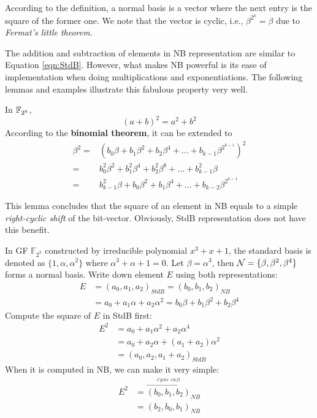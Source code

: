 According to the definition, a normal basis is a vector where the next entry is the square of the former one.
We note that the vector is cyclic, i.e., $\beta^{2^k} = \beta$ due to {\it Fermat's little theorem}.

The addition and subtraction of elements in NB representation are similar to Equation \ref{eqn:StdB}.
However, what makes NB powerful is its ease of implementation when doing multiplications and exponentiations.
The following lemmas and examples illustrate this fabulous property very well.
\begin{Lemma}[Square of NB]
\label{lem:squareNB}
In ${\mathbb{F}}_{2^k}$, 
\begin{equation*}
(a+b)^2 = a^2 + b^2
\end{equation*}
According to the \textbf{binomial theorem}, it can be extended to
\begin{align*}
\beta^2 =&(b_0\beta + b_1\beta^2 + b_2\beta^4 + \dots + b_{k-1}\beta^{2^{k-1}})^2 \\
=& b_0^2\beta^2 + b_1^2\beta^4 + b_2^2\beta^8 + \dots + b_{k-1}^2\beta \\
=& b_{k-1}^2\beta + b_0\beta^2 + b_1\beta^4 + \dots + b_{k-2}\beta^{2^{k-1}}
\end{align*}
\end{Lemma}
This lemma concludes that the square of an element in NB equals to a simple {\it right-cyclic shift} of the bit-vector.
Obviously, StdB representation does not have this benefit.

\begin{Example}[Square of NB]
In GF $\mathbb F_{2^3}$ constructed by irreducible polynomial $x^3 + x + 1$, the standard basis is denoted as 
$\{ 1, \alpha, \alpha^2\}$ where $\alpha^3+\alpha+1=0$.
Let $\beta = \alpha^3$, then ${\mathcal{N}} = \{ \beta, \beta^2, \beta^4\}$ forms a normal basis. 
Write down element $E$ using both representations:
\begin{align*}
E &= (a_0,a_1,a_2)_{StdB} = (b_0,b_1,b_2)_{NB} \\
  &= a_0 + a_1\alpha + a_2\alpha^2 = b_0\beta + b_1\beta^2 + b_2\beta^4
\end{align*}
Compute the square of $E$ in StdB first:
\begin{align*}
E^2 &= a_0 + a_1\alpha^2 + a_2\alpha^4 \\
    &= a_0 + a_2\alpha + (a_1 + a_2)\alpha^2 \\
    &= (a_0,a_2,a_1+a_2)_{StdB}
\end{align*}
When it is computed in NB, we can make it very simple:
\begin{align*}
E^2 &= \overset{\xrightarrow{Cyclic~~shift}}{(b_0,b_1,b_2)}_{NB} \\
	&= (b_2,b_0,b_1)_{NB}
\end{align*}
\end{Example}

